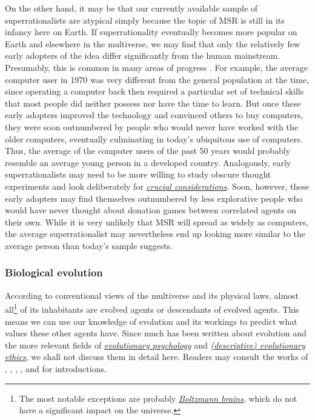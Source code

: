 On the other hand, it may be that our currently available sample of
superrationalists are atypical simply because the topic of MSR is still
in its infancy here on Earth. If superrationality eventually becomes
more popular on Earth and elsewhere in the multiverse, we may find that
only the relatively few early adopters of the idea differ significantly
from the human mainstream. Presumably, this is common in many areas of
progress \parencite{Rogers2010-hg}. For example, the average
computer user in 1970 was very different from the general population at
the time, since operating a computer back then required a particular set
of technical skills that most people did neither possess nor have the
time to learn. But once these early adopters improved the technology and
convinced others to buy computers, they were soon outnumbered by people
who would never have worked with the older computers, eventually
culminating in today's ubiquitous use of computers. Thus, the average of
the computer users of the past 50 years would probably resemble an
average young person in a developed country. Analogously, early
superrationalists may need to be more willing to study obscure thought
experiments and look deliberately for
\href{https://concepts.effectivealtruism.org/concepts/the-importance-of-crucial-considerations/}{\emph{crucial
considerations}}. Soon, however, these early adopters may find
themselves outnumbered by less explorative people who would have never
thought about donation games between correlated agents on their own.
While it is very unlikely that MSR will spread as widely as computers,
the average superrationalist may nevertheless end up looking more
similar to the average person than today's sample suggests.

\subsubsection{Biological evolution}\label{biological-evolution}

According to conventional views of the multiverse and its physical laws,
almost all\footnote{The most notable exceptions are probably
  \href{https://en.wikipedia.org/wiki/Boltzmann_brain}{\emph{Boltzmann
  brains}}, which do not have a significant impact on the universe.} of
its inhabitants are evolved agents or descendants of evolved agents.
This means we can use our knowledge of evolution and its workings to
predict what values these other agents have. Since much has been written
about evolution and the more relevant fields of
\href{https://en.wikipedia.org/wiki/Evolutionary_psychology}{\emph{evolutionary
psychology}} and
\href{https://en.wikipedia.org/wiki/Evolutionary_ethics\#Descriptive_evolutionary_ethics}{\emph{(descriptive)
evolutionary ethics}}, we shall not discuss them in detail here. Readers
may consult the works of \parencite{Pinker1999-dd},
\parencite{Stewart-Williams2015-io},
\parencite{Greene2013-sq},
\parencite{Axelrod2006-ci}, and
\parencite{Buss2015-kp} for introductions.

